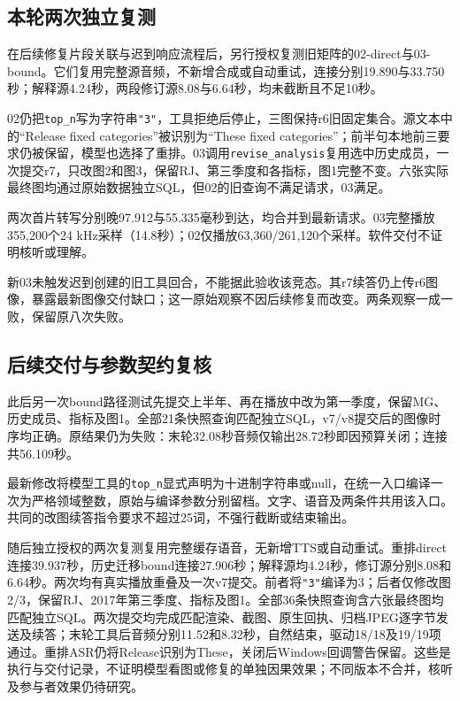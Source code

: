 \documentclass[conference]{IEEEtran}
\begin{document}
\subsection{本轮两次独立复测}
在后续修复片段关联与迟到响应流程后，另行授权复测旧矩阵的02-direct与03-bound。它们复用完整源音频，不新增合成或自动重试，连接分别19.890与33.750秒；解释源4.24秒，两段修订源8.08与6.64秒，均未截断且不足10秒。

02仍把\texttt{top\_n}写为字符串\texttt{"3"}，工具拒绝后停止，三图保持r6旧固定集合。源文本中的“Release fixed categories”被识别为“These fixed categories”；前半句本地前三要求仍被保留，模型也选择了重排。03调用\texttt{revise\_analysis}复用选中历史成员，一次提交r7，只改图2和图3，保留RJ、第三季度和各指标，图1完整不变。六张实际最终图均通过原始数据独立SQL，但02的旧查询不满足请求，03满足。

两次首片转写分别晚97.912与55.335毫秒到达，均合并到最新请求。03完整播放355,200个24 kHz采样（14.8秒）；02仅播放63,360/261,120个采样。软件交付不证明核听或理解。

新03未触发迟到创建的旧工具回合，不能据此验收该竞态。其r7续答仍上传r6图像，暴露最新图像交付缺口；这一原始观察不因后续修复而改变。两条观察一成一败，保留原八次失败。

\subsection{后续交付与参数契约复核}
此后另一次bound路径测试先提交上半年、再在播放中改为第一季度，保留MG、历史成员、指标及图1。全部21条快照查询匹配独立SQL，v7/v8提交后的图像时序均正确。原结果仍为失败：末轮32.08秒音频仅输出28.72秒即因预算关闭；连接共56.109秒。

最新修改将模型工具的\texttt{top\_n}显式声明为十进制字符串或null，在统一入口编译一次为严格领域整数，原始与编译参数分别留档。文字、语音及两条件共用该入口。共同的改图续答指令要求不超过25词，不强行截断或结束输出。

随后独立授权的两次复测复用完整缓存语音，无新增TTS或自动重试。重排direct连接39.937秒，历史迁移bound连接27.906秒；解释源均4.24秒，修订源分别8.08和6.64秒。两次均有真实播放重叠及一次v7提交。前者将\texttt{"3"}编译为3；后者仅修改图2/3，保留RJ、2017年第三季度、指标及图1。全部36条快照查询含六张最终图均匹配独立SQL。两次提交均完成匹配渲染、截图、原生回执、归档JPEG逐字节发送及续答；末轮工具后音频分别11.52和8.32秒，自然结束，驱动18/18及19/19项通过。重排ASR仍将Release识别为These，关闭后Windows回调警告保留。这些是执行与交付记录，不证明模型看图或修复的单独因果效果；不同版本不合并，核听及参与者效果仍待研究。
\end{document}
